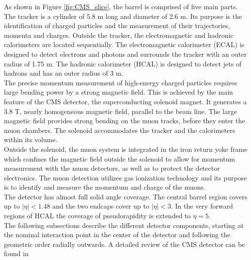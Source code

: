 As shown in Figure \ref{fig:CMS_slice}, the barrel is comprised of five main parts. The tracker is a cylinder of 5.8 m long and diameter of 2.6 m. Its purpose is the identification of charged particles and the measurement of their trajectories, momenta and charges. Outside the tracker, the electromagnetic and hadronic calorimeters are located sequentially. The electromagnetic calorimeter (ECAL) is designed to detect electrons and photons and surrounds the tracker with an outer radius of 1.75 m. The hadronic calorimeter (HCAL) is designed to detect jets of hadrons and has an outer radius of 3 m.\\
\indent The precise momentum measurement of high-energy charged particles requires large bending power by a strong magnetic field. This is achieved by the main feature of the CMS detector, the superconducting solenoid magnet. It generates a 3.8 T, nearly homogeneous magnetic field, parallel to the beam line. The large magnetic field provides strong bending on the muon tracks, before they enter the muon chambers. The solenoid accommodates the tracker and the calorimeters within its volume.\\
\indent Outside the solenoid, the muon system is integrated in the iron return yoke frame which confines the magnetic field outside the solenoid to allow for momentum measurement with the muon detectors, as well as to protect the detector electronics. The muon detection utilizes gas ionization technology and its purpose is to identify and measure the momentum and charge of the muons.\\
\indent The detector has almost full solid angle coverage. The central barrel region covers up to $|\eta| < 1.48$ and the two endcaps cover up to $|\eta| < 3$. In the very forward regions of HCAL the coverage of pseudorapidity is extended to $\eta = 5$.\\
\indent The following subsections describe the different detector components, starting at the nominal interaction point in the center of the detector and following the geometric order radially outwards. A detailed review of the CMS detector can be found in \cite{CMS:2008xjf, CMS_sketch}

